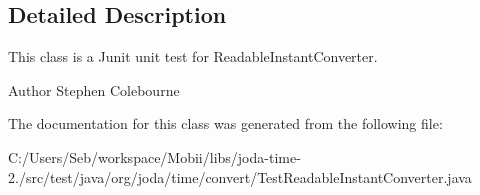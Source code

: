 \subsection{Detailed Description}
This class is a Junit unit test for Readable\-Instant\-Converter.

\begin{DoxyAuthor}{Author}
Stephen Colebourne 
\end{DoxyAuthor}


The documentation for this class was generated from the following file\-:\begin{DoxyCompactItemize}
\item 
C\-:/\-Users/\-Seb/workspace/\-Mobii/libs/joda-\/time-\/2./src/test/java/org/joda/time/convert/Test\-Readable\-Instant\-Converter.\-java\end{DoxyCompactItemize}
